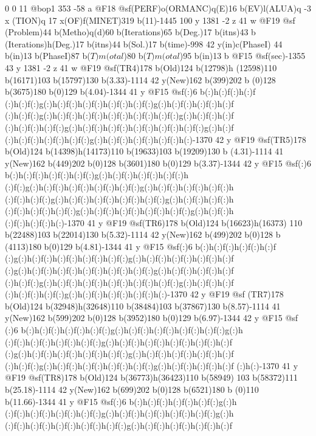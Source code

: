 {{{{{{{{{{{{{{{{{{{{{{{{{{{{{{{{{{{{{{{{{{{{{{{{{{{{{{{{{{{{{{{{{{{{{{{{{{0 0 11 @bop1 353 -58 a @F18 @sf(PERF)o(ORMANC)q(E)16 b(EV)l(ALUA)q -3 x
(TION)q 17 x(OF)f(MINET)319 b(11)-1445 100 y 1381 -2 z 41 w @F19 @sf
(Problem)44 b(Metho)q(d)60 b(Iterations)65 b(Deg.)17 b(itns)43 b
(Iterations)h(Deg.)17 b(itns)44 b(Sol.)17 b(time)-998 42 y(in)c(Phase{I)
44 b(in)13 b(Phase{I)87 b(\(T)m(otal\))80 b(\(T)m(otal\))95 b(in)13 b 
@F15 @sf(sec)-1355 43 y 1381 -2 z 41 w @F19 @sf(TR4)178 b(Old)124 b(12798)h
(12598)110 b(16171)103 b(15797)130 b(3.33)-1114 42 y(New)162 b(399)202 b
(0)128 b(3675)180 b(0)129 b(4.04)-1344 41 y @F15 @sf(:)6 b(:)h(:)f(:)h(:)f
(:)h(:)f(:)g(:)h(:)f(:)h(:)f(:)h(:)f(:)h(:)f(:)g(:)h(:)f(:)h(:)f(:)h(:)f
(:)h(:)f(:)g(:)h(:)f(:)h(:)f(:)h(:)f(:)h(:)f(:)h(:)f(:)g(:)h(:)f(:)h(:)f
(:)h(:)f(:)h(:)f(:)g(:)h(:)f(:)h(:)f(:)h(:)f(:)h(:)f(:)h(:)f(:)g(:)h(:)f
(:)h(:)f(:)h(:)f(:)h(:)f(:)g(:)h(:)f(:)h(:)f(:)h(:)f(:)h(:)-1370 42 y 
@F19 @sf(TR5)178 b(Old)124 b(14398)h(14173)110 b(19633)103 b(19209)130 b
(4.31)-1114 41 y(New)162 b(449)202 b(0)128 b(3601)180 b(0)129 b(3.37)-1344 
42 y @F15 @sf(:)6 b(:)h(:)f(:)h(:)f(:)h(:)f(:)g(:)h(:)f(:)h(:)f(:)h(:)f(:)h
(:)f(:)g(:)h(:)f(:)h(:)f(:)h(:)f(:)h(:)f(:)g(:)h(:)f(:)h(:)f(:)h(:)f(:)h
(:)f(:)h(:)f(:)g(:)h(:)f(:)h(:)f(:)h(:)f(:)h(:)f(:)g(:)h(:)f(:)h(:)f(:)h
(:)f(:)h(:)f(:)h(:)f(:)g(:)h(:)f(:)h(:)f(:)h(:)f(:)h(:)f(:)g(:)h(:)f(:)h
(:)f(:)h(:)f(:)h(:)-1370 41 y @F19 @sf(TR6)178 b(Old)124 b(16623)h(16373)
110 b(22488)103 b(22014)130 b(5.32)-1114 42 y(New)162 b(499)202 b(0)128 b
(4113)180 b(0)129 b(4.81)-1344 41 y @F15 @sf(:)6 b(:)h(:)f(:)h(:)f(:)h(:)f
(:)g(:)h(:)f(:)h(:)f(:)h(:)f(:)h(:)f(:)g(:)h(:)f(:)h(:)f(:)h(:)f(:)h(:)f
(:)g(:)h(:)f(:)h(:)f(:)h(:)f(:)h(:)f(:)h(:)f(:)g(:)h(:)f(:)h(:)f(:)h(:)f
(:)h(:)f(:)g(:)h(:)f(:)h(:)f(:)h(:)f(:)h(:)f(:)h(:)f(:)g(:)h(:)f(:)h(:)f
(:)h(:)f(:)h(:)f(:)g(:)h(:)f(:)h(:)f(:)h(:)f(:)h(:)-1370 42 y @F19 @sf
(TR7)178 b(Old)124 b(32948)h(32648)110 b(38484)103 b(37867)130 b(8.57)-1114 
41 y(New)162 b(599)202 b(0)128 b(3952)180 b(0)129 b(6.97)-1344 42 y @F15 @sf
(:)6 b(:)h(:)f(:)h(:)f(:)h(:)f(:)g(:)h(:)f(:)h(:)f(:)h(:)f(:)h(:)f(:)g(:)h
(:)f(:)h(:)f(:)h(:)f(:)h(:)f(:)g(:)h(:)f(:)h(:)f(:)h(:)f(:)h(:)f(:)h(:)f
(:)g(:)h(:)f(:)h(:)f(:)h(:)f(:)h(:)f(:)g(:)h(:)f(:)h(:)f(:)h(:)f(:)h(:)f
(:)h(:)f(:)g(:)h(:)f(:)h(:)f(:)h(:)f(:)h(:)f(:)g(:)h(:)f(:)h(:)f(:)h(:)f
(:)h(:)-1370 41 y @F19 @sf(TR8)178 b(Old)124 b(36773)h(36423)110 b(58949)
103 b(58372)111 b(25.18)-1114 42 y(New)162 b(699)202 b(0)128 b(6521)180 b
(0)110 b(11.66)-1344 41 y @F15 @sf(:)6 b(:)h(:)f(:)h(:)f(:)h(:)f(:)g(:)h
(:)f(:)h(:)f(:)h(:)f(:)h(:)f(:)g(:)h(:)f(:)h(:)f(:)h(:)f(:)h(:)f(:)g(:)h
(:)f(:)h(:)f(:)h(:)f(:)h(:)f(:)h(:)f(:)g(:)h(:)f(:)h(:)f(:)h(:)f(:)h(:)f
}}}}}}}}}}}}}}}}}}}}}}}}}}}}}}}}}}}}}}}}}}}}}}}}}}}}}}}}}}}}}}}}}}}}}}}}}}}}
